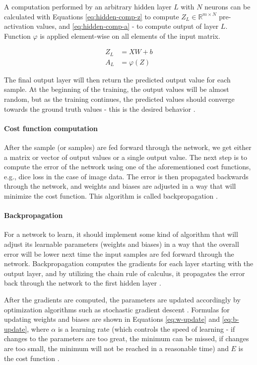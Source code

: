 A computation performed by an arbitrary hidden layer $L$ with $N$ neurons can be calculated with Equations \ref{eq:hidden-comp-z} to compute $Z_L \in \mathbb{R}^{m \!\times\! N}$ pre-activation values, and \ref{eq:hidden-comp-a} - to compute output of layer $L$. Function $\varphi$ is applied element-wise on all elements of the input matrix.

\begin{align}
\label{eq:hidden-comp-z}
Z_L &= XW + b \\
\label{eq:hidden-comp-a}
A_L &= \varphi(Z)
\end{align}

The final output layer will then return the predicted output value for each sample. At the beginning of the training, the output values will be almost random, but as the training continues, the predicted values should converge towards the ground truth values - this is the desired behavior \cite{Goodfellow2016, LeCun2015}.

\paragraph{Cost function computation}
After the sample (or samples) are fed forward through the network, we get either a matrix or vector of output values or a single output value. The next step is to compute the error of the network using one of the aforementioned cost functions, e.g., dice loss in the case of image data. The error is then propagated backwards through the network, and weights and biases are adjusted in a way that will minimize the cost function. This algorithm is called backpropagation \cite{Goodfellow2016}.

\paragraph{Backpropagation}
For a network to learn, it should implement some kind of algorithm that will adjust its learnable parameters (weights and biases) in a way that the overall error will be lower next time the input samples are fed forward through the network. Backpropagation computes the gradients for each layer starting with the output layer, and by utilizing the chain rule of calculus, it propagates the error back through the network to the first hidden layer \cite{LeCun2015}.

After the gradients are computed, the parameters are updated accordingly by optimization algorithms such as stochastic gradient descent \cite{Santosh2022-2}. Formulas for updating weights and biases are shown in Equations \ref{eq:w-update} and \ref{eq:b-update}, where $\alpha$ is a learning rate (which controls the speed of learning - if changes to the parameters are too great, the minimum can be missed, if changes are too small, the minimum will not be reached in a reasonable time) and $E$ is the cost function \cite{Goodfellow2016, LeCun2015}.

